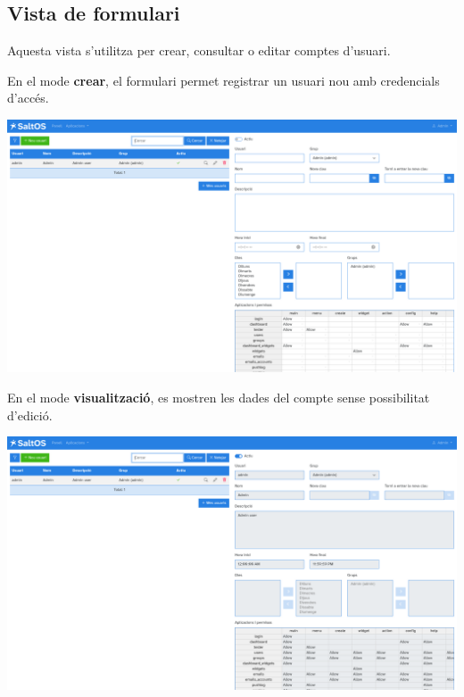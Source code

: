 \documentclass[a4paper]{article}
\begin{document}
\hypertarget{toc184}{}
\subsection{Vista de formulari}

Aquesta vista s'utilitza per crear, consultar o editar comptes d'usuari.

En el mode \textbf{crear}, el formulari permet registrar un usuari nou amb credencials d'accés.

\begin{center}\includegraphics[width=1\textwidth]{../ujest/snaps/test-screenshots-js-screenshots-users-users-create-ca-es-1-snap.png}\end{center}

En el mode \textbf{visualització}, es mostren les dades del compte sense possibilitat d'edició.

\begin{center}\includegraphics[width=1\textwidth]{../ujest/snaps/test-screenshots-js-screenshots-users-users-view-1-ca-es-1-snap.png}\end{center}
\end{document}
